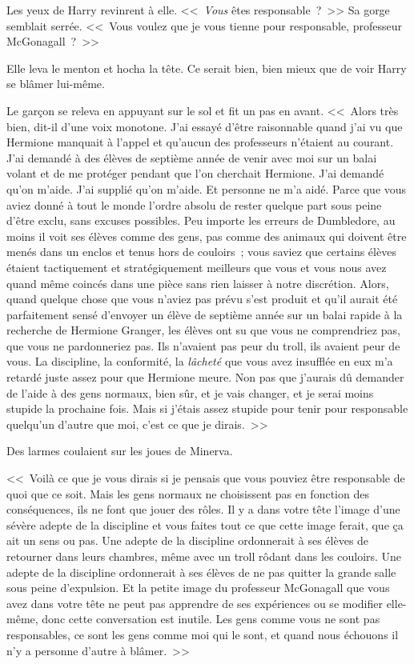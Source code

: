 Les yeux de Harry revinrent à elle. <<~\emph{Vous} êtes responsable~?~>> Sa gorge semblait serrée. <<~Vous voulez que je vous tienne pour responsable, professeur McGonagall~?~>>

Elle leva le menton et hocha la tête. Ce serait bien, bien mieux que de voir Harry se blâmer lui-même.

Le garçon se releva en appuyant sur le sol et fit un pas en avant. <<~Alors très bien, dit-il d'une voix monotone. J'ai essayé d'être raisonnable quand j'ai vu que Hermione manquait à l'appel et qu'aucun des professeurs n'étaient au courant. J'ai demandé à des élèves de septième année de venir avec moi sur un balai volant et de me protéger pendant que l'on cherchait Hermione. J'ai demandé qu'on m'aide. J'ai supplié qu'on m'aide. Et personne ne m'a aidé. Parce que vous aviez donné à tout le monde l'ordre absolu de rester quelque part sous peine d'être exclu, sans excuses possibles. Peu importe les erreurs de Dumbledore, au moins il voit ses élèves comme des gens, pas comme des animaux qui doivent être menés dans un enclos et tenus hors de couloirs~; vous saviez que certains élèves étaient tactiquement et stratégiquement meilleurs que vous et vous nous avez quand même coincés dans une pièce sans rien laisser à notre discrétion. Alors, quand quelque chose que vous n'aviez pas prévu s'est produit et qu'il aurait été parfaitement sensé d'envoyer un élève de septième année sur un balai rapide à la recherche de Hermione Granger, les élèves ont su que vous ne comprendriez pas, que vous ne pardonneriez pas. Ils n'avaient pas peur du troll, ils avaient peur de vous. La discipline, la conformité, la \emph{lâcheté} que vous avez insufflée en eux m'a retardé juste assez pour que Hermione meure. Non pas que j'aurais dû demander de l'aide à des gens normaux, bien sûr, et je vais changer, et je serai moins stupide la prochaine fois. Mais si j'étais assez stupide pour tenir pour responsable quelqu'un d'autre que moi, c'est ce que je dirais.~>>

Des larmes coulaient sur les joues de Minerva.

<<~Voilà ce que je vous dirais si je pensais que vous pouviez être responsable de quoi que ce soit. Mais les gens normaux ne choisissent pas en fonction des conséquences, ils ne font que jouer des rôles. Il y a dans votre tête l'image d'une sévère adepte de la discipline et vous faites tout ce que cette image ferait, que ça ait un sens ou pas. Une adepte de la discipline ordonnerait à ses élèves de retourner dans leurs chambres, même avec un troll rôdant dans les couloirs. Une adepte de la discipline ordonnerait à ses élèves de ne pas quitter la grande salle sous peine d'expulsion. Et la petite image du professeur McGonagall que vous avez dans votre tête ne peut pas apprendre de ses expériences ou se modifier elle-même, donc cette conversation est inutile. Les gens comme vous ne sont pas responsables, ce sont les gens comme moi qui le sont, et quand nous échouons il n'y a personne d'autre à blâmer.~>>


